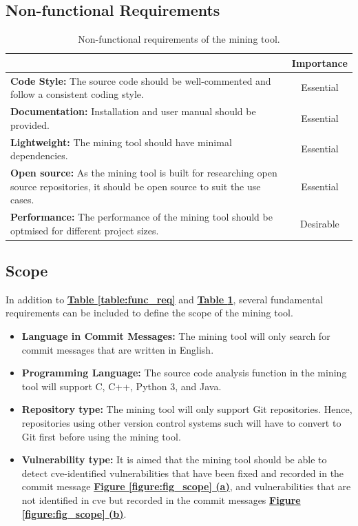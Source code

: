 \documentclass[12pt, a4paper]{report}
\begin{document}
\subsection{Non-functional Requirements}
\begin{table}[H]
  \centering
  \begin{tabular}{|p{10.3cm}|c|}
    \hline
    \rowcolor[HTML]{D8D8D8}
    \multicolumn{1}{|c|}{Criteria} & Importance \\ \hline
    \textbf{Code Style:} The source code should be well-commented and follow a consistent coding
    style. & Essential  \\ \hline
    \textbf{Documentation:} Installation and user manual should be provided. & Essential \\ \hline
    \textbf{Lightweight:} The mining tool should have minimal dependencies. & Essential \\ \hline
    \textbf{Open source:} As the mining tool is built for researching open source repositories, it
    should be open source to suit the use cases. & Essential \\ \hline
    \textbf{Performance:} The performance of the mining tool should be optmised for different
    project sizes. & Desirable \\ \hline
  \end{tabular}
  \caption{Non-functional requirements of the mining tool.} \label{table:nonfunc_req}
\end{table}

\subsection{Scope}
In addition to \hyperref[table:func_req]{\textbf{Table \ref*{table:func_req}}} and
\hyperref[table:nonfunc_req]{\textbf{Table \ref*{table:nonfunc_req}}}, several fundamental
requirements can be included to define the scope of the mining tool.

\begin{itemize}
  \item \textbf{Language in Commit Messages:} The mining tool will only search for commit messages
  that are written in English.
  \item \textbf{Programming Language:} The source code analysis function in the mining tool will
  support C, C++, Python 3, and Java.
  \item \textbf{Repository type:} The mining tool will only support Git repositories. Hence,
  repositories using other version control systems such will have to convert to Git first before
  using the mining tool.
  \item \textbf{Vulnerability type:} It is aimed that the mining tool should be able to detect
  \acrshort{cve}-identified vulnerabilities that have been fixed and recorded in the commit message
  \hyperref[figure:cve_vuln]{\textbf{Figure \ref*{figure:fig_scope} (a)}}, and vulnerabilities that
  are not identified in \acrshort{cve} but recorded in the commit messages
  \hyperref[figure:common_vuln]{\textbf{Figure \ref*{figure:fig_scope} (b)}}.
\end{itemize}
\end{document}
